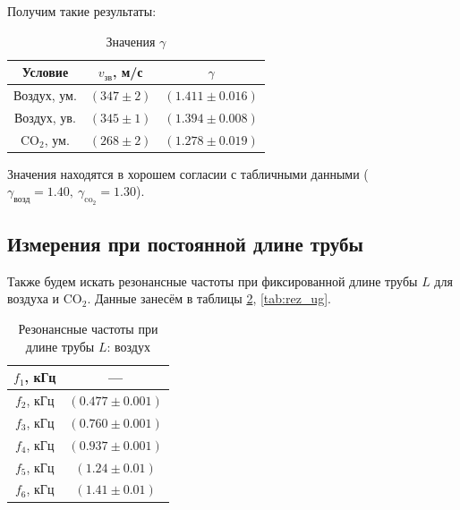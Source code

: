 \documentclass[a4paper,12pt]{article}
\begin{document}
Получим такие результаты:
\begin{table}[h!]
	\centering
	\caption{Значения $\gamma$}
	\label{tab:gamma_res}
	\begin{tabular}{|c|c|c|}
		\hline 
		Условие&$v_{\text{зв}}$, м/с & $\gamma$\\ 
		\hline 
		Воздух, ум.&$(347\pm2)$ & $(1.411\pm0.016)$ \\ 
		\hline 
		Воздух, ув.&$(345\pm1)$ & $(1.394\pm0.008)$ \\ 
		\hline 
		CO$_2$, ум.&$(268\pm2)$ & $(1.278\pm0.019)$ \\ 
		\hline 
	\end{tabular} 
\end{table}

Значения находятся в хорошем согласии с табличными данными ($\gamma_{\text{возд}}=1.40,\ \gamma_{\text{co$_2$}}=1.30$).
\subsection{Измерения при постоянной длине трубы}

Также будем искать резонансные частоты при фиксированной длине трубы $L$ для воздуха и CO$_2$. Данные занесём в таблицы \ref{tab:rez_v}, \ref{tab:rez_ug}.

\begin{table}[h!]
	\centering
	\caption{Резонансные частоты при длине трубы $L$: воздух}
	\label{tab:rez_v}
	\begin{tabular}{|c|c|}
		\hline 
		\rule[0ex]{0pt}{2.5ex} $f_1$, кГц & --- \\ 
		\hline 
		\rule[0ex]{0pt}{2.5ex} $f_2$, кГц & $(0.477\pm0.001)$ \\ 
		\hline 
		\rule[0ex]{0pt}{2.5ex} $f_3$, кГц & $(0.760\pm0.001)$ \\ 
		\hline 
		\rule[0ex]{0pt}{2.5ex} $f_4$, кГц & $(0.937\pm0.001)$ \\ 
		\hline 
		\rule[0ex]{0pt}{2.5ex} $f_5$, кГц & $(1.24\pm0.01)$ \\ 
		\hline 
		\rule[0ex]{0pt}{2.5ex} $f_6$, кГц & $(1.41\pm0.01)$ \\ 
		\hline 
	\end{tabular} 
\end{table}
\end{document}

